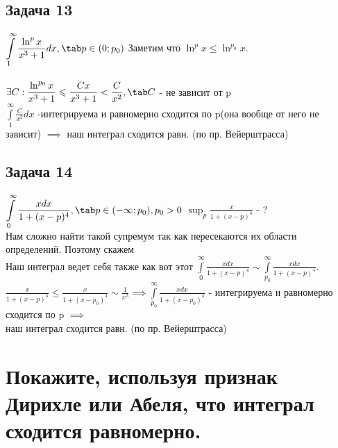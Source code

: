 \documentclass[a4paper, fleqn]{article}
\newcommand\ds{\displaystyle}
\begin{document}

\subsection*{Задача 13}
$\ds\int\limits_1^\infty \frac{\ln^px}{x^3+1} dx, \tab p \in (0; p_0)\\$
Заметим что $\ds\ln^px \leq \ln^{p_0}x$.\\\\
$\ds\exists C: \frac{\ln^{p_0} x}{x^3+1} \leq  \frac{Cx}{x^3+1} <  \frac{C}{x^2}, \tab C$ - не зависит от p \\
$\ds\int\limits_1^\infty \frac{C}{x^2} dx$ -интегрируема и равномерно сходится по p(она вообще от него не зависит) $\implies$ наш интеграл сходится равн. (по пр. Вейерштрасса)
\subsection*{Задача 14}
$\ds\int\limits_0^\infty \frac{xdx}{1+ (x-p)^4}, \tab p \in (-\infty; p_0), p_0 > 0\\$
$\ds \sup_{p} \frac{x}{1+ (x-p)^4}$ - ? \\
Нам сложно найти такой супремум так как пересекаются их области определений. Поэтому скажем \\
Наш интеграл ведет себя также как вот этот $\ds\int\limits_0^\infty \frac{xdx}{1+ (x-p)^4} \sim \int\limits_{p_0}^\infty \frac{xdx}{1+ (x-p)^4}$. \\
$\ds\frac{x}{1+ (x-p)^4} \leq \frac{x}{1+ (x-p_0)^4} \sim \frac{1}{x^3} \implies \int\limits_{p_0}^\infty \frac{xdx}{1+ (x-p_0)^4}$ - интегрируема и равномерно сходится по p  $\implies$ \\ наш интеграл сходится равн. (по пр. Вейерштрасса)

\section*{Покажите, используя признак Дирихле или Абеля, что интеграл сходится равномерно.}

\end{document}
